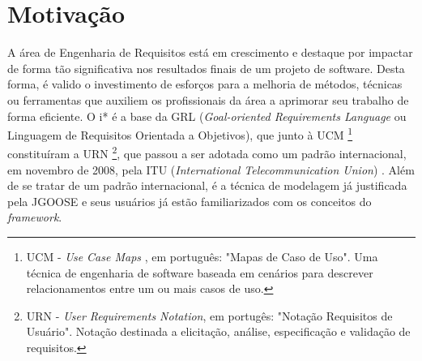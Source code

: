     \section{Motivação}
        \label{cap:introducao:sec:motivacao}
            A área de Engenharia de Requisitos está em crescimento e destaque
            por impactar de forma tão significativa nos resultados finais de um projeto de software.
            Desta forma,
            é valido o investimento de esforços para a melhoria de métodos, técnicas ou ferramentas que auxiliem os profissionais da área a aprimorar seu trabalho de forma eficiente.
                    O i* é a base da GRL (\emph{Goal-oriented Requirements Language} ou Linguagem de Requisitos Orientada a Objetivos),
                    que junto à UCM
                        \footnote{UCM - \emph{Use Case Maps} , em português: "Mapas de Caso de Uso". Uma técnica de engenharia de software baseada em cenários para descrever relacionamentos entre um ou mais casos de uso.}
                    constituíram a URN
                        \footnote{URN - \emph{User Requirements Notation}, em portugês: "Notação Requisitos de Usuário". Notação destinada a elicitação, análise, especificação e validação de requisitos.},
                    que passou a ser adotada como um padrão internacional,
                    em novembro de 2008,
                    pela ITU (\emph{International Telecommunication Union})
                        \cite{amyot2003introduction}
                        \cite{itu2003urn}. %
                    Além de se tratar de um padrão internacional,
                    é a técnica de modelagem já justificada pela JGOOSE
                    e seus usuários já estão familiarizados com os conceitos do \emph{framework}.

